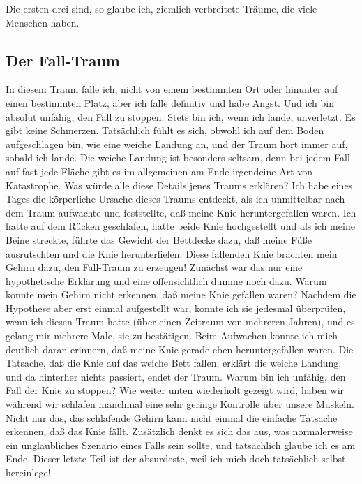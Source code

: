 Die ersten drei sind, so glaube ich, ziemlich verbreitete Träume, die viele Menschen haben.
 

\subsection{Der Fall-Traum}
\label{c3_5b}

In diesem Traum falle ich, nicht von einem bestimmten Ort oder hinunter auf einen bestimmten Platz, aber ich falle definitiv und habe Angst.
Und ich bin absolut unfähig, den Fall zu stoppen.
Stets bin ich, wenn ich lande, unverletzt.
Es gibt keine Schmerzen.
Tatsächlich fühlt es sich, obwohl ich auf dem Boden aufgeschlagen bin, wie eine weiche Landung an, und der Traum hört immer auf, sobald ich lande.
Die weiche Landung ist besonders seltsam, denn bei jedem Fall auf fast jede Fläche gibt es im allgemeinen am Ende irgendeine Art von Katastrophe.
Was würde alle diese Details jenes Traums erklären?
Ich habe eines Tages die körperliche Ursache dieses Traums entdeckt, als ich unmittelbar nach dem Traum aufwachte und feststellte, daß meine Knie heruntergefallen waren.
Ich hatte auf dem Rücken geschlafen, hatte beide Knie hochgestellt und als ich meine Beine streckte, führte das Gewicht der Bettdecke dazu, daß meine Füße ausrutschten und die Knie herunterfielen.
Diese fallenden Knie brachten mein Gehirn dazu, den Fall-Traum zu erzeugen!
Zunächst war das nur eine hypothetische Erklärung und eine offensichtlich dumme noch dazu.
Warum konnte mein Gehirn nicht erkennen, daß meine Knie gefallen waren?
Nachdem die Hypothese aber erst einmal aufgestellt war, konnte ich sie jedesmal überprüfen, wenn ich diesen Traum hatte (über einen Zeitraum von mehreren Jahren), und es gelang mir mehrere Male, sie zu bestätigen.
Beim Aufwachen konnte ich mich deutlich daran erinnern, daß meine Knie gerade eben heruntergefallen waren.
Die Tatsache, daß die Knie auf das weiche Bett fallen, erklärt die weiche Landung, und da hinterher nichts passiert, endet der Traum.
Warum bin ich unfähig, den Fall der Knie zu stoppen?
Wie weiter unten wiederholt gezeigt wird, haben wir während wir schlafen manchmal eine sehr geringe Kontrolle über unsere Muskeln.
Nicht nur das, das schlafende Gehirn kann nicht einmal die einfache Tatsache erkennen, daß das Knie fällt.
Zusätzlich denkt es sich das aus, was normalerweise ein unglaubliches Szenario eines Falls sein sollte, und tatsächlich glaube ich es am Ende.
Dieser letzte Teil ist der absurdeste, weil ich mich doch tatsächlich selbst hereinlege!


